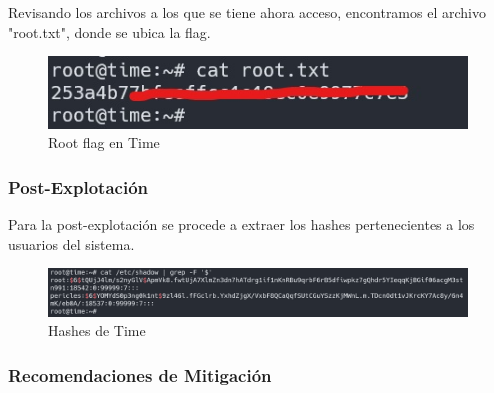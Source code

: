         \large{Revisando los archivos a los que se tiene ahora acceso, encontramos el archivo "root.txt", donde se ubica la flag.}
        \par
        \begin{figure}[H]
            \centering
            \includegraphics[width=0.99\textwidth]{imagenes/time/16_root_flag_time.jpg}
            \caption{Root flag en Time}
        \end{figure}

    \subsubsection{Post-Explotación}

        \large{Para la post-explotación se procede a extraer los hashes pertenecientes a los usuarios del sistema.}
        \par
        \begin{figure}[H]
            \centering
            \includegraphics[width=0.99\textwidth]{imagenes/time/17_hashes_time.png}
            \caption{Hashes de Time}
        \end{figure}

    \subsubsection{Recomendaciones de Mitigación}
